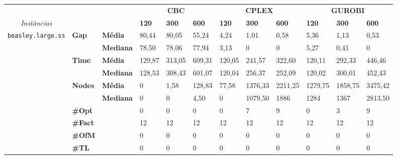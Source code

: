 
	\begin{footnotesize}	
	\caption{}
	\label{cflp:tab:3}
	\begin{tabular}{c@{\hskip 0.2cm}l@{\hskip 0.1cm}l|lll|lll|lll}
	& & & \multicolumn{3}{c}{\textbf{CBC}} & \multicolumn{3}{c}{\textbf{CPLEX}} & \multicolumn{3}{c}{\textbf{GUROBI}} 	\\\textit{Instâncias} & & & \textbf{120} & \textbf{300} & \textbf{600} & \textbf{120} & \textbf{300} & \textbf{600} & \textbf{120} & \textbf{300} & \textbf{600} \\
\hline
\multirow{7}{*}{\texttt{beasley.large.ss}} & \multirow{2}{*}{\textbf{Gap}} & \textbf{Média} & 80,44 & 80,05 & 55,24 & 4,24 & 1,01 & 0,58 & 5,36 & 1,13 & 0,53 \\
 & & \textbf{Mediana} & 78,50 & 78,06 & 77,94 & 3,13 & 0 & 0 & 5,27 & 0,41 & 0 \\
\cline{2-12}
 & \multirow{2}{*}{\textbf{Time}} & \textbf{Média} & 129,87 & 313,05 & 609,31 & 120,05 & 241,57 & 322,60 & 120,11 & 292,33 & 446,46 \\
 & & \textbf{Mediana} & 128,53 & 308,43 & 601,07 & 120,04 & 256,37 & 252,09 & 120,02 & 300,01 & 452,43 \\
\cline{2-12}
 & \multirow{2}{*}{\textbf{Nodes}} & \textbf{Média} & 0 & 1,58 & 128,83 & 77,58 & 1376,33 & 2211,25 & 1279,75 & 1858,75 & 3475,42 \\
 & & \textbf{Mediana} & 0 & 0 & 4,50 & 0 & 1079,50 & 1886 & 1284 & 1367 & 2813,50 \\
\cline{2-12}
 & \textbf{\#Opt} & & 0 & 0 & 0 & 0 & 7 & 9 & 0 & 3 & 9 \\
 & \textbf{\#Fact} & & 12 & 12 & 12 & 12 & 12 & 12 & 12 & 12 & 12 \\
 & \textbf{\#OfM} & & 0 & 0 & 0 & 0 & 0 & 0 & 0 & 0 & 0 \\
 & \textbf{\#TL} & & 0 & 0 & 0 & 0 & 0 & 0 & 0 & 0 & 0 \\
	\end{tabular}
	\end{footnotesize}


